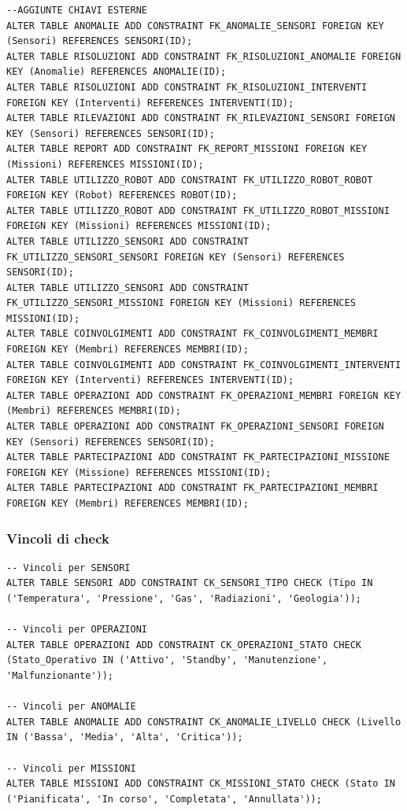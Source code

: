 \documentclass{article}
\begin{document}
\begin{verbatim}
--AGGIUNTE CHIAVI ESTERNE
ALTER TABLE ANOMALIE ADD CONSTRAINT FK_ANOMALIE_SENSORI FOREIGN KEY (Sensori) REFERENCES SENSORI(ID);
ALTER TABLE RISOLUZIONI ADD CONSTRAINT FK_RISOLUZIONI_ANOMALIE FOREIGN KEY (Anomalie) REFERENCES ANOMALIE(ID);
ALTER TABLE RISOLUZIONI ADD CONSTRAINT FK_RISOLUZIONI_INTERVENTI FOREIGN KEY (Interventi) REFERENCES INTERVENTI(ID);
ALTER TABLE RILEVAZIONI ADD CONSTRAINT FK_RILEVAZIONI_SENSORI FOREIGN KEY (Sensori) REFERENCES SENSORI(ID);
ALTER TABLE REPORT ADD CONSTRAINT FK_REPORT_MISSIONI FOREIGN KEY (Missioni) REFERENCES MISSIONI(ID);
ALTER TABLE UTILIZZO_ROBOT ADD CONSTRAINT FK_UTILIZZO_ROBOT_ROBOT FOREIGN KEY (Robot) REFERENCES ROBOT(ID);
ALTER TABLE UTILIZZO_ROBOT ADD CONSTRAINT FK_UTILIZZO_ROBOT_MISSIONI FOREIGN KEY (Missioni) REFERENCES MISSIONI(ID);
ALTER TABLE UTILIZZO_SENSORI ADD CONSTRAINT FK_UTILIZZO_SENSORI_SENSORI FOREIGN KEY (Sensori) REFERENCES SENSORI(ID);
ALTER TABLE UTILIZZO_SENSORI ADD CONSTRAINT FK_UTILIZZO_SENSORI_MISSIONI FOREIGN KEY (Missioni) REFERENCES MISSIONI(ID);
ALTER TABLE COINVOLGIMENTI ADD CONSTRAINT FK_COINVOLGIMENTI_MEMBRI FOREIGN KEY (Membri) REFERENCES MEMBRI(ID);
ALTER TABLE COINVOLGIMENTI ADD CONSTRAINT FK_COINVOLGIMENTI_INTERVENTI FOREIGN KEY (Interventi) REFERENCES INTERVENTI(ID);
ALTER TABLE OPERAZIONI ADD CONSTRAINT FK_OPERAZIONI_MEMBRI FOREIGN KEY (Membri) REFERENCES MEMBRI(ID);
ALTER TABLE OPERAZIONI ADD CONSTRAINT FK_OPERAZIONI_SENSORI FOREIGN KEY (Sensori) REFERENCES SENSORI(ID);
ALTER TABLE PARTECIPAZIONI ADD CONSTRAINT FK_PARTECIPAZIONI_MISSIONE FOREIGN KEY (Missione) REFERENCES MISSIONI(ID);
ALTER TABLE PARTECIPAZIONI ADD CONSTRAINT FK_PARTECIPAZIONI_MEMBRI FOREIGN KEY (Membri) REFERENCES MEMBRI(ID);
\end{verbatim}

\subsubsection{Vincoli di check}

\begin{verbatim}
-- Vincoli per SENSORI
ALTER TABLE SENSORI ADD CONSTRAINT CK_SENSORI_TIPO CHECK (Tipo IN ('Temperatura', 'Pressione', 'Gas', 'Radiazioni', 'Geologia'));

-- Vincoli per OPERAZIONI
ALTER TABLE OPERAZIONI ADD CONSTRAINT CK_OPERAZIONI_STATO CHECK (Stato_Operativo IN ('Attivo', 'Standby', 'Manutenzione', 'Malfunzionante'));

-- Vincoli per ANOMALIE
ALTER TABLE ANOMALIE ADD CONSTRAINT CK_ANOMALIE_LIVELLO CHECK (Livello IN ('Bassa', 'Media', 'Alta', 'Critica'));

-- Vincoli per MISSIONI
ALTER TABLE MISSIONI ADD CONSTRAINT CK_MISSIONI_STATO CHECK (Stato IN ('Pianificata', 'In corso', 'Completata', 'Annullata'));
\end{verbatim}
\end{document}
